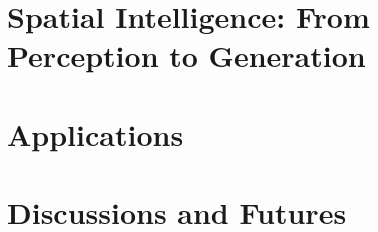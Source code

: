 \documentclass[twoside,12pt,english,openany]{book}
\begin{document}
\part{Spatial Intelligence: From Perception to Generation}
\label{part:3}

\part{Applications}
\label{part:applications}

\part{Discussions and Futures}








\end{document}
